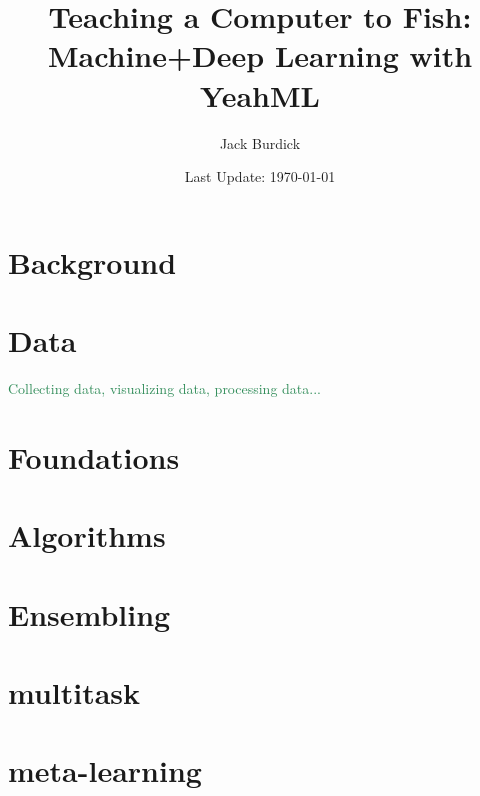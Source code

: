 \documentclass[12pt]{book}
\title{Teaching a Computer to Fish: Machine+Deep Learning with YeahML}
\author{Jack Burdick}
\date{Last Update: \today} %
\def\r#1{\textcolor{SeaGreen}{#1}}
\begin{document}
 
	
\frontmatter

\maketitle 

\tableofcontents

\mainmatter

\part{Background}







\part{Data}
\r{Collecting data, visualizing data, processing data...}



\part{Foundations}



\part{Algorithms}


\part{Ensembling}






\part{multitask}



\part{meta-learning}
\end{document}
